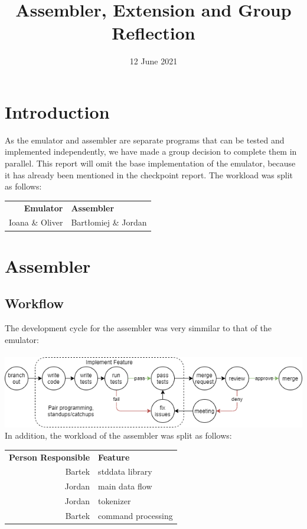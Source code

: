 \documentclass[11pt]{article}
\title{\vspace*{-1cm}Assembler, Extension and Group Reflection}
\date{\vspace*{-1cm}12 June 2021}
\begin{document}
\maketitle

\section{Introduction}
As the emulator and assembler are separate programs that can be tested and implemented independently, we have made a group decision to complete them in parallel. This report will omit the base implementation of the emulator, because it has already been mentioned in the checkpoint report. The workload was split as follows:
\begin{center}
	\begin{tabular}{ r | l }
		\textbf{Emulator} & \textbf{Assembler} \\
		Ioana \& Oliver & Bartłomiej \& Jordan
	\end{tabular}
\end{center}
\section{Assembler}
\subsection*{Workflow}
The development cycle for the assembler was very simmilar to that of the emulator:\\\\
\includegraphics[width = \textwidth]{development cycle}
In addition, the workload of the assembler was split as follows:\\
\begin{center}
	\begin{tabular}{r|l}
		\textbf{Person Responsible} & \textbf{Feature} \\\
		Bartek & stddata library \\
		Jordan & main data flow \\
		Jordan & tokenizer \\
		Bartek & command processing \\
	\end{tabular}
\end{center}
\end{document}

